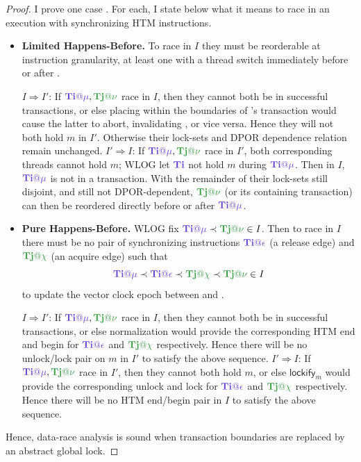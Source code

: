 \begin{proof}
I prove one case .
For each, I state below what it means to race in an execution with synchronizing HTM instructions.

\begin{itemize}
	\item {\bf Limited Happens-Before.}
		To race in $I$ they must be reorderable at instruction granularity,
		at least one with a thread switch immediately before or after
		\cite{tsan,hybriddatarace}.
		\begin{itemize}
			\llitem $I \Rightarrow I'$:
				If $\tiiat{\mu},\tjjat{\nu}$ race in $I$,
				then they cannot both be in successful transactions,
				or else placing \tiiat{\mu} within the boundaries of \tjjat{\nu}'s transaction
				would cause the latter to abort, invalidating \tjjat{\nu}, or vice versa.
				Hence they will not both hold $m$ in $I'$.
				Otherwise their lock-sets and DPOR dependence relation remain unchanged.
			\llitem $I' \Rightarrow I$:
				If $\tiiat{\mu},\tjjat{\nu}$ race in $I'$,
				both corresponding threads cannot hold $m$;
				WLOG let $\tii$ not hold $m$ during $\tiiat{\mu}$.
				Then in $I$, $\tiiat{\mu}$ is not in a transaction.
				With the remainder of their lock-sets still disjoint,
				and still not DPOR-dependent, $\tjjat{\nu}$ (or its containing transaction)
				can then be reordered directly before or after $\tiiat{\mu}$.
		\end{itemize}
	\item {\bf Pure Happens-Before.}
		WLOG fix $\tiiat{\mu} \prec \tjjat{\nu} \in I$.
		Then to race in $I$ there must be no pair of synchronizing instructions
		$\tiiat{\epsilon}$ (a release edge) and $\tjjat{\chi}$ (an acquire edge) such that
		\[
			\tiiat{\mu} \prec \tiiat{\epsilon} \prec \tjjat{\chi} \prec \tjjat{\nu} \in I
		\]
		to update the vector clock epoch between \tiiat{\mu} and \tjjat{\nu} \cite{djit,fasttrack}.
		\begin{itemize}
			\llitem $I \Rightarrow I'$:
				If $\tiiat{\mu},\tjjat{\nu}$ race in $I$,
				then they cannot both be in successful transactions,
				or else  normalization would provide
				the corresponding HTM end and begin for $\tiiat{\epsilon}$ and $\tjjat{\chi}$ respectively.
				Hence there will be no unlock/lock pair on $m$ in $I'$ to satisfy the above sequence.
			\llitem $I' \Rightarrow I$:
				If $\tiiat{\mu},\tjjat{\nu}$ race in $I'$,
				then they cannot both hold $m$,
				or else $\mathsf{lockify}_m$ would provide the corresponding
				unlock and lock for $\tiiat{\epsilon}$ and $\tjjat{\chi}$ respectively.
				Hence there will be no HTM end/begin pair in $I$ to satisfy the above sequence.
		\end{itemize}
\end{itemize}
Hence, data-race analysis is sound when transaction boundaries are replaced by an abstract global lock.
\end{proof}

